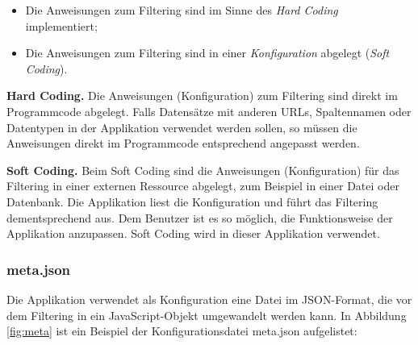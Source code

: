 \begin{itemize}
	\item Die Anweisungen zum Filtering sind im Sinne des \textit{Hard Coding} implementiert;
	\item Die Anweisungen zum Filtering sind in einer \textit{Konfiguration} abgelegt (\textit{Soft Coding}).
\end{itemize}

\textbf{Hard Coding.} Die Anweisungen (Konfiguration) zum Filtering sind direkt im Programmcode abgelegt. Falls Datensätze mit anderen URLs, Spaltennamen oder Datentypen in der Applikation verwendet werden sollen, so müssen die Anweisungen direkt im Programmcode entsprechend angepasst werden.

\textbf{Soft Coding.} Beim Soft Coding sind die Anweisungen (Konfiguration) für das Filtering in einer externen Ressource abgelegt, zum Beispiel in einer Datei oder Datenbank. Die Applikation liest die Konfiguration und führt das Filtering dementsprechend aus. Dem Benutzer ist es so möglich, die Funktionsweise der Applikation anzupassen. Soft Coding wird in dieser Applikation verwendet.

\subsubsection{meta.json}

Die Applikation verwendet als Konfiguration eine Datei im JSON-Format, die vor dem Filtering in ein JavaScript-Objekt umgewandelt werden kann. In Abbildung \ref{fig:meta} ist ein Beispiel der Konfigurationsdatei meta.json aufgelistet:


